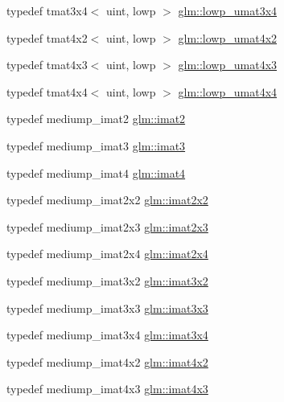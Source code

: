 \begin{DoxyCompactItemize}
\item 
typedef tmat3x4$<$ uint, lowp $>$ \hyperlink{group__gtc__matrix__integer_ga2ed807c71afb8c0f8742bb03e9f71829}{glm\-::lowp\-\_\-umat3x4}
\item 
typedef tmat4x2$<$ uint, lowp $>$ \hyperlink{group__gtc__matrix__integer_ga5f4e6bb892b20b532bd9caa9aee120b9}{glm\-::lowp\-\_\-umat4x2}
\item 
typedef tmat4x3$<$ uint, lowp $>$ \hyperlink{group__gtc__matrix__integer_gae94cb13770f09d0a086e6fb627f47b84}{glm\-::lowp\-\_\-umat4x3}
\item 
typedef tmat4x4$<$ uint, lowp $>$ \hyperlink{group__gtc__matrix__integer_ga6ec13ea43b4328e29219f8515c188997}{glm\-::lowp\-\_\-umat4x4}
\item 
typedef mediump\-\_\-imat2 \hyperlink{group__gtc__matrix__integer_ga77a581b3366fb63fc72f8f20830003e0}{glm\-::imat2}
\item 
typedef mediump\-\_\-imat3 \hyperlink{group__gtc__matrix__integer_ga45481922dd07a3a8e23758286311ee97}{glm\-::imat3}
\item 
typedef mediump\-\_\-imat4 \hyperlink{group__gtc__matrix__integer_ga40fc5c5e0b07543497aa1c314891544a}{glm\-::imat4}
\item 
typedef mediump\-\_\-imat2x2 \hyperlink{group__gtc__matrix__integer_gaf7f44f44d966377666d41ed059524732}{glm\-::imat2x2}
\item 
typedef mediump\-\_\-imat2x3 \hyperlink{group__gtc__matrix__integer_ga143bc5177bac9991d84b70da03952516}{glm\-::imat2x3}
\item 
typedef mediump\-\_\-imat2x4 \hyperlink{group__gtc__matrix__integer_gafe2d058e164fd1badace451ffcf4ae46}{glm\-::imat2x4}
\item 
typedef mediump\-\_\-imat3x2 \hyperlink{group__gtc__matrix__integer_ga04deef94cdfdd3b3b2706e10a32ef7f3}{glm\-::imat3x2}
\item 
typedef mediump\-\_\-imat3x3 \hyperlink{group__gtc__matrix__integer_gaeff9ef8f56cccc828d6b897923e75402}{glm\-::imat3x3}
\item 
typedef mediump\-\_\-imat3x4 \hyperlink{group__gtc__matrix__integer_gaee5507e6cbbdd05841a0c174e60dd036}{glm\-::imat3x4}
\item 
typedef mediump\-\_\-imat4x2 \hyperlink{group__gtc__matrix__integer_ga7e733984837e0e7aa9f4aac18f632f63}{glm\-::imat4x2}
\item 
typedef mediump\-\_\-imat4x3 \hyperlink{group__gtc__matrix__integer_gaa4cca8e80c0603239eda452860063844}{glm\-::imat4x3}
\item 

\end{DoxyCompactItemize}
